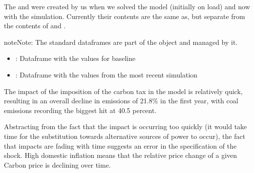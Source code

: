 \documentclass[letterpaper,10pt,english]{jupyterBook}
\begin{document}
\sphinxAtStartPar
The   and  were created by us when we solved the model (initially on load) and now with the simulation.  Currently their contents are the same as, but separate from the contents of  and .

\begin{sphinxadmonition}{note}{Note:}
\sphinxAtStartPar
The standard dataframes are part of the  object and managed by it.
\begin{itemize}
\item {} 
\sphinxAtStartPar
{}: Dataframe with the values for baseline

\item {} 
\sphinxAtStartPar
{}: Dataframe with the values from the most recent simulation

\end{itemize}
\end{sphinxadmonition}

\sphinxAtStartPar
The impact of the imposition of the carbon tax in the model is relatively quick, resulting in an overall decline in emissions of 21.8\% in the first year, with coal emissions recording the biggest hit at \sphinxhyphen{}40.5 percent.

\sphinxAtStartPar
Abstracting from the fact that the impact is occurring too quickly (it would take time for the substitution towards alternative sources of power to occur), the fact that impacts are fading with time suggests an error in the specification of the shock.  High domestic inflation means that the relative price change of a given Carbon price is declining over time.
\end{document}

